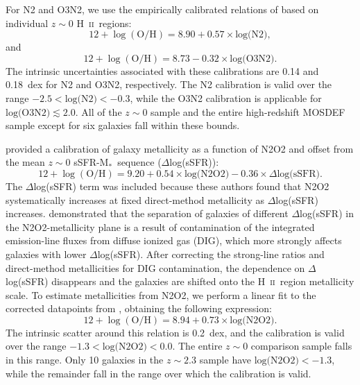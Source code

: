 \documentclass[iop,twocolappendix]{emulateapj}
\newcommand{\mstar}{$\mbox{M}_*$}
\newcommand{\hii}{H~\textsc{ii}\ }
\begin{document}
For N2 and O3N2, we use the empirically calibrated relations of \citet{pet04} based on individual $z\sim0$ \hii regions:
\begin{equation}\label{eq:pp04n2}
12+\log{(\mbox{O/H})}=8.90+0.57\times\mbox{log(N2)} ,
\end{equation}
and
\begin{equation}\label{eq:pp04o3n2}
12+\log{(\mbox{O/H})}=8.73-0.32\times\mbox{log(O3N2)} .
\end{equation}
The intrinsic uncertainties associated with these calibrations are 0.14 and 0.18~dex
 for N2 and O3N2, respectively.  The N2 calibration is valid over the range
 $-2.5<\text{log(N2)}<-0.3$, while the O3N2 calibration is applicable for $\text{log(O3N2)}\lesssim2.0$.
  All of the $z\sim0$ sample and the entire high-redshift MOSDEF sample except for six galaxies
 fall within these bounds.

\citet{bro16} provided a calibration of galaxy metallicity as a function of N2O2 and offset
 from the mean $z\sim0$ sSFR-\mstar\ sequence ($\Delta$log(sSFR)):
\begin{equation}\label{eq:b16n2o2}
12+\log{(\mbox{O/H})}=9.20+0.54\times\mbox{log(N2O2)}-0.36\times\Delta\mbox{log(sSFR)} .
\end{equation}
The $\Delta$log(sSFR) term
 was included because these authors found that N2O2 systematically increases at fixed
 direct-method metallicity as $\Delta$log(sSFR) increases.  \citet{san17} demonstrated that
 the separation of galaxies of different $\Delta$log(sSFR) in the N2O2-metallicity plane
 is a result of contamination of the integrated emission-line fluxes from diffuse ionized gas (DIG),
 which more strongly affects galaxies with lower $\Delta$log(sSFR).
  After correcting the \citet{bro16} strong-line ratios and direct-method metallicities
 for DIG contamination, the dependence on
 $\Delta$log(sSFR) disappears and the galaxies are shifted onto the \hii region metallicity scale.
  To estimate metallicities from N2O2, we perform a linear fit to the corrected \citet{bro16}
 datapoints from \citet{san17}, obtaining the following expression:
\begin{equation}\label{eq:newn2o2}
12+\log{(\mbox{O/H})}=8.94+0.73\times\mbox{log(N2O2)} .
\end{equation}
  The intrinsic scatter around this relation is 0.2~dex, and the calibration is valid over
 the range $-1.3<\text{log(N2O2)}<0.0$.  The entire $z\sim0$ comparison sample falls in this
 range.  Only 10 galaxies in the $z\sim2.3$ sample have $\text{log(N2O2)}<-1.3$, while the
 remainder fall in the range over which the calibration is valid.
\end{document}
